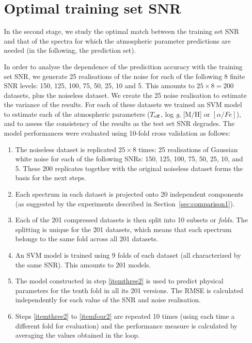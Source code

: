 \documentclass[a4paper,fleqn,usenatbib]{mnras}
\begin{document}
{{{%
\section{Optimal training set SNR}
\label{sec:comparison2}

In the second stage, we study the optimal match between the training
set SNR and that of the spectra for which the atmospheric parameter
predictions are needed (in the following, the prediction set).

In order to analyse the dependence of the predicition accuracy with
the training set SNR, we generate 25 realisations of the noise for
each of the following 8 finite SNR levels: 150, 125, 100, 75, 50, 25,
10 and 5. This amounts to $25\times 8=200$ datasets, plus the
noiseless dataset. We create the 25 noise realisation to estimate the
variance of the results. For each of these datasets we trained an SVM
model to estimate each of the atmospheric parameters ($T_{\rm
  eff}$, log \textit{g}, [M/H] or $\left[ \alpha/Fe \right]$), and to 
assess the consistency of the results as the test set SNR degrades. 
The model performances were evaluated using 10-fold cross validation 
as follows:

\begin{enumerate}
\item The noiseless dataset is replicated $25\times 8$ times: 25
  realisations of Gaussian white noise for each of the following SNRs:
  150, 125, 100, 75, 50, 25, 10, and 5. These 200 replicates together
  with the original noiseless dataset forms the basis for the next
  steps.
\item Each spectrum in each dataset is projected onto 20 independent
  components (as suggested by the experiments described in
  Section~\ref{sec:comparison1}).
\item Each of the 201 compressed datasets is then split into 10
  subsets or \textit{folds}. The splitting is unique for the 201
  datasets, which means that each spectrum belongs to the same fold
  across all 201 datasets.
\item \label{itemthree2} An SVM model is trained using 9 folds of each
  dataset (all characterized by the same SNR). This amounts to 201
  models.
\item \label{itemfour2} The model constructed in step \ref{itemthree2}
  is used to predict physical parameters for the tenth fold in all its
  201 versions. The RMSE is calculated independently for each value of
  the SNR and noise realisation.
\item \label{itemfive2} Steps \ref{itemthree2} to \ref{itemfour2} are
  repeated 10 times (using each time a different fold for evaluation)
  and the performance measure is calculated by averaging the values
  obtained in the loop.
\end{enumerate}

}}}
\end{document}
